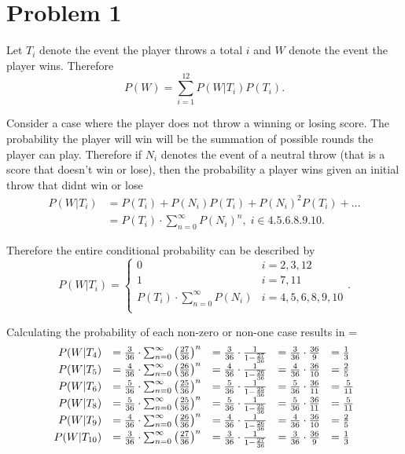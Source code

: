 \documentclass[12pt]{extarticle}
\begin{document}
\section*{Problem 1}

Let $T_i$ denote the event the player throws a total $i$ and $W$ denote the event the player wins. Therefore
\[
	P(W) = \sum_{i=1}^{12} P(W | T_i) P(T_i)
.\]

Consider a case where the player does not throw a winning or losing score. The probability the player will win will be the summation of possible rounds the player can play. Therefore if $N_i$ denotes the event of a neutral throw (that is a score that doesn't win or lose), then the probability a player wins given an initial throw that didnt win or lose
\begin{align*}
	P(W | T_i) &= P(T_i) + P(N_i)P(T_i) + P(N_i)^2 P(T_i) + \ldots \\
						 &= P(T_i) \cdot\sum_{n=0}^{\infty} P(N_i)^n, \; i\in\qty{4,5,6,8,9,10}
.\end{align*}

Therefore the entire conditional probability can be described by
\[
	P(W | T_i) = 
	\begin{cases}
		0 & i = 2,3,12 \\
		1 & i = 7,11 \\
		P(T_i)\cdot \displaystyle\sum_{n=0}^\infty P(N_i) & i = 4,5,6,8,9,10 \\
	\end{cases}
.\]

Calculating the probability of each non-zero or non-one case results in
{
	\everymath={\displaystyle}
\[
	\begin{array}{rcccl}
	P(W | T_4)  &= \frac{3}{36} \cdot \sum_{n=0}^{\infty} \qty(\frac{27}{36})^n &= \frac{3}{36} \cdot \frac{1}{1 - \frac{27}{36}} &= \frac{3}{36} \cdot \frac{36}{9}  &= \frac{1}{3} \\
	P(W | T_5)  &= \frac{4}{36} \cdot \sum_{n=0}^{\infty} \qty(\frac{26}{36})^n &= \frac{4}{36} \cdot \frac{1}{1 - \frac{26}{36}} &= \frac{4}{36} \cdot \frac{36}{10} &= \frac{2}{5} \\
	P(W | T_6)  &= \frac{5}{36} \cdot \sum_{n=0}^{\infty} \qty(\frac{25}{36})^n &= \frac{5}{36} \cdot \frac{1}{1 - \frac{25}{36}} &= \frac{5}{36} \cdot \frac{36}{11} &= \frac{5}{11} \\
	P(W | T_8)  &= \frac{5}{36} \cdot \sum_{n=0}^{\infty} \qty(\frac{25}{36})^n &= \frac{5}{36} \cdot \frac{1}{1 - \frac{25}{36}} &= \frac{5}{36} \cdot \frac{36}{11} &= \frac{5}{11} \\
	P(W | T_9)  &= \frac{4}{36} \cdot \sum_{n=0}^{\infty} \qty(\frac{26}{36})^n &= \frac{4}{36} \cdot \frac{1}{1 - \frac{26}{36}} &= \frac{4}{36} \cdot \frac{36}{10} &= \frac{2}{5} \\
	P(W | T_{10}) &= \frac{3}{36} \cdot \sum_{n=0}^{\infty} \qty(\frac{27}{36})^n &= \frac{3}{36} \cdot \frac{1}{1 - \frac{27}{36}} &= \frac{3}{36} \cdot \frac{36}{9}  &= \frac{1}{3} \\
	\end{array}
\]
}
\end{document}
